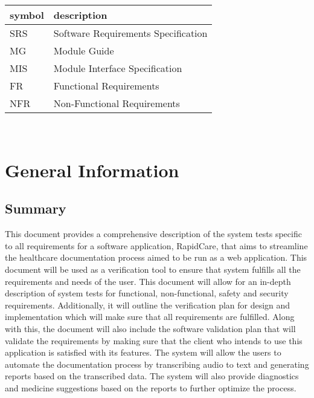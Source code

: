 \documentclass[12pt, titlepage]{article}
\begin{document}
\renewcommand{\arraystretch}{1.2}
\begin{tabular}{l l} 
  \toprule		
  \textbf{symbol} & \textbf{description}\\
  \midrule 
  SRS & Software Requirements Specification\\
  MG & Module Guide\\
  MIS & Module Interface Specification\\
  FR & Functional Requirements\\
  NFR & Non-Functional Requirements\\
  \bottomrule
\end{tabular}\\


\newpage


\section{General Information} \label{section:2}

\subsection{Summary} \label{section:2.1}

This document provides a comprehensive description of the system tests specific to all requirements for a software application, RapidCare, that aims to streamline the healthcare documentation process aimed to be run as a web application. This document will be used as a verification tool to ensure that system fulfills all the requirements and needs of the user. This document will allow for an in-depth description of system tests for functional, non-functional, safety and security requirements. Additionally, it will outline the verification plan for design and implementation which will make sure that all requirements are fulfilled. Along with this, the document will also include the software validation plan that will validate the requirements by making sure that the client who intends to use this application is satisfied with its features. The system will allow the users to automate the documentation process by transcribing audio to text and generating reports based on the transcribed data. The system will also provide diagnostics and medicine suggestions based on the reports to further optimize the process.    
\end{document}
